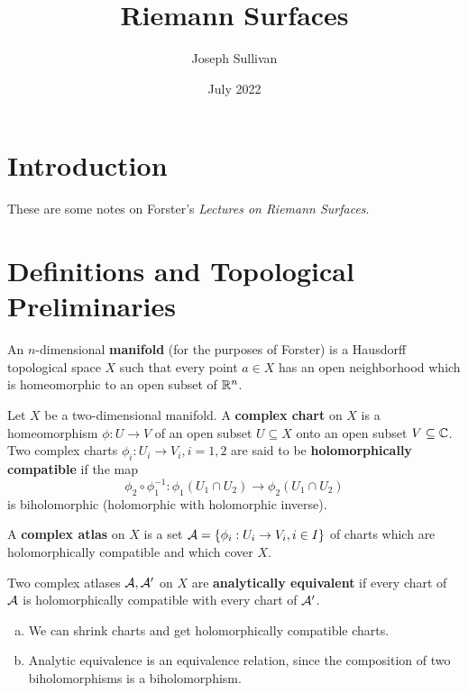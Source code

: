 \documentclass[12pt]{article}
\title{Riemann Surfaces}
\author{Joseph Sullivan}
\date{July 2022}
\begin{document}
\maketitle

\section*{Introduction}

These are some notes on Forster's \textit{Lectures on Riemann Surfaces}.

\section{Definitions and Topological Preliminaries}

\begin{defn}
    An $n$-dimensional \textbf{manifold} (for the purposes of Forster) is a Hausdorff topological space $X$ such that every point $a\in X$ has an open neighborhood which is homeomorphic to an open subset of $\mathbb{R}^n$.
\end{defn}

\begin{defn}
    Let $X$ be a two-dimensional manifold. A \textbf{complex chart} on $X$ is a homeomorphism $\phi: U\to V$ of an open subset $U\subseteq X$ onto an open subset $V\subseteq \mathbb{C}$. Two complex charts $\phi_i: U_i\to V_i, i=1,2$ are said to be \textbf{holomorphically compatible} if the map
    \[
        \phi_2\circ \phi_1^{-1} : \phi_1(U_1\cap U_2) \to \phi_2(U_1\cap U_2)
    \]
    is biholomorphic (holomorphic with holomorphic inverse).
    
    A \textbf{complex atlas} on $X$ is a set $\cA=\{\phi_i:U_i \to V_i, i\in I\}$ of charts which are holomorphically compatible and which cover $X$.
    
    Two complex atlases $\mathcal{A}, \mathcal{A}'$ on $X$ are \textbf{analytically equivalent} if every chart of $\mathcal{A}$ is holomorphically compatible with every chart of $\mathcal{A}'$.
\end{defn}

\begin{rmk}\;
    \begin{enumerate}[(a)]
        \item We can shrink charts and get holomorphically compatible charts.
        \item Analytic equivalence is an equivalence relation, since the composition of two biholomorphisms is a biholomorphism.
    \end{enumerate}
\end{rmk}
\end{document}
